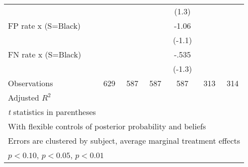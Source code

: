 \begin{table}[htbp]
\begin{tabular}{l*{6}{c}}
                &                  &                  &                  &    (1.3)         &                  &                  \\
FP rate x (S=Black)&                  &                  &                  &    -1.06         &                  &                  \\
                &                  &                  &                  &   (-1.1)         &                  &                  \\
FN rate x (S=Black)&                  &                  &                  &    -.535         &                  &                  \\
                &                  &                  &                  &   (-1.3)         &                  &                  \\
\hline
Observations    &      629         &      587         &      587         &      587         &      313         &      314         \\
Adjusted \(R^{2}\)&                  &                  &                  &                  &                  &                  \\
\hline\hline
\multicolumn{7}{l}{\footnotesize \textit{t} statistics in parentheses}\\
\multicolumn{7}{l}{\footnotesize With flexible controls of posterior probability and beliefs}\\
\multicolumn{7}{l}{\footnotesize Errors are clustered by subject, average marginal treatment effects}\\
\multicolumn{7}{l}{\footnotesize \sym{*} \(p<0.10\), \sym{**} \(p<0.05\), \sym{***} \(p<0.01\)}\\
\end{tabular}
\end{table}

